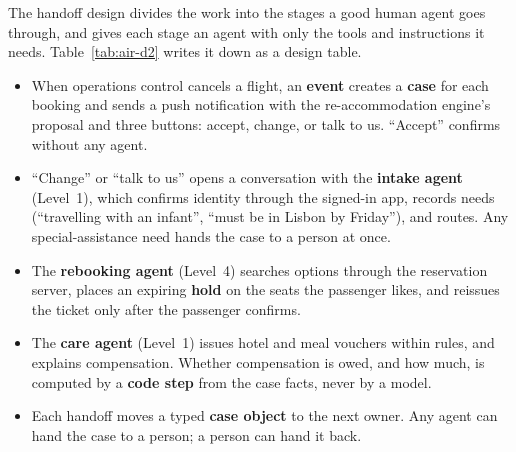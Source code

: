 The handoff design divides the work into the stages a good human agent goes through, and gives each stage an agent with only the tools and instructions it needs. Table~\ref{tab:air-d2} writes it down as a design table.
\begin{itemize}[itemsep=1pt]
  \item When operations control cancels a flight, an \textbf{event} creates a \textbf{case} for each booking and sends a push notification with the re-accommodation engine's proposal and three buttons: accept, change, or talk to us. ``Accept'' confirms without any agent.
  \item ``Change'' or ``talk to us'' opens a conversation with the \textbf{intake agent} (Level~1), which confirms identity through the signed-in app, records needs (``travelling with an infant'', ``must be in Lisbon by Friday''), and routes. Any special-assistance need hands the case to a person at once.
  \item The \textbf{rebooking agent} (Level~4) searches options through the reservation server, places an expiring \textbf{hold} on the seats the passenger likes, and reissues the ticket only after the passenger confirms.
  \item The \textbf{care agent} (Level~1) issues hotel and meal vouchers within rules, and explains compensation. Whether compensation is owed, and how much, is computed by a \textbf{code step} from the case facts, never by a model.
  \item Each handoff moves a typed \textbf{case object} to the next owner. Any agent can hand the case to a person; a person can hand it back.
\end{itemize}

